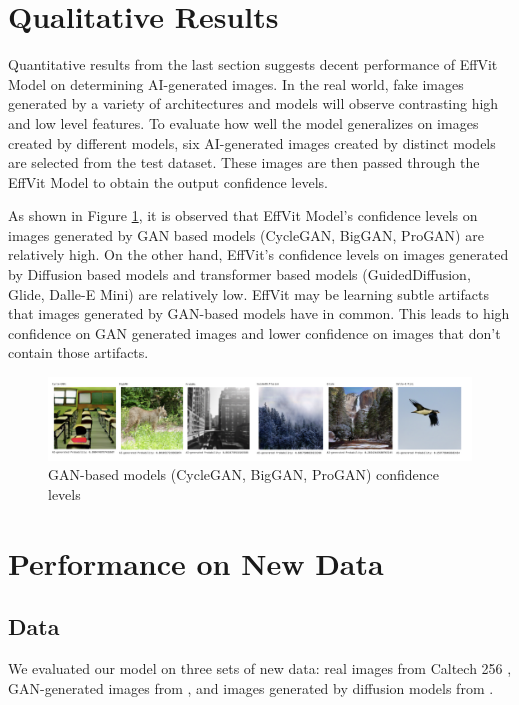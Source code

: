 \documentclass{article} %
\begin{document}
\section{Qualitative Results}
Quantitative results from the last section suggests decent performance of EffVit Model on determining AI-generated images. In the real world, fake images generated by a variety of architectures and models will observe contrasting high and low level features. To evaluate how well the model generalizes on images created by different models, six AI-generated images created by distinct models are selected from the test dataset. These images are then passed through the EffVit Model to obtain the output confidence levels.

As shown in Figure \ref{fig:Conf}, it is observed that EffVit Model's confidence levels on images generated by GAN based models (CycleGAN, BigGAN, ProGAN) are relatively high. On the other hand, EffVit's confidence levels on images generated by Diffusion based models and transformer based models (GuidedDiffusion, Glide, Dalle-E Mini) are relatively low. EffVit may be learning subtle artifacts that images generated by GAN-based models have in common. This leads to high confidence on GAN generated images and lower confidence on images that don't contain those artifacts.

\begin{figure}[h]
    \begin{center}
        \includegraphics[scale=0.38]{figs/Confidence.png}
    \end{center}
    \caption{GAN-based models (CycleGAN, BigGAN, ProGAN) confidence levels}
    \label{fig:Conf}
\end{figure}


\section{Performance on New Data}

\subsection{Data}

We evaluated our model on three sets of new data: real images from Caltech 256 \citep{griffinholubperona2022}, GAN-generated images from \citet{chuangchuangtanGANGenDetection}, and images generated by diffusion models from \citet{stable-diffusion-100k-custom-prompts-and-images}.
\end{document}
